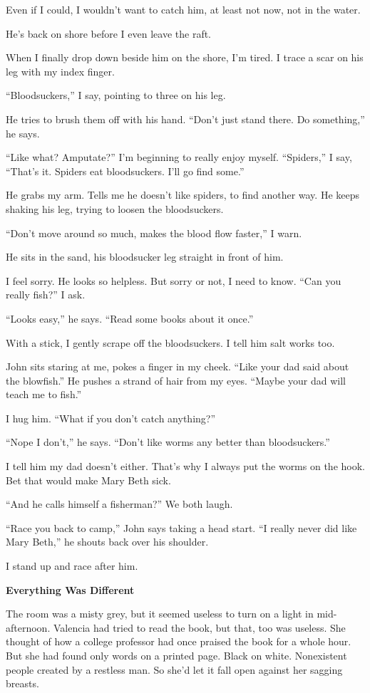 \documentclass[
]{article}
\begin{document}
Even if I could, I wouldn't want to catch him, at least not now, not in
the water.

He's back on shore before I even leave the raft.

When I finally drop down beside him on the shore, I'm tired. I trace a
scar on his leg with my index finger.

``Bloodsuckers,'' I say, pointing to three on his leg.

He tries to brush them off with his hand. ``Don't just stand there. Do
something,'' he says.

``Like what? Amputate?'' I'm beginning to really enjoy myself.
``Spiders,'' I say, ``That's it. Spiders eat bloodsuckers. I'll go find
some.''

He grabs my arm. Tells me he doesn't like spiders, to find another way.
He keeps shaking his leg, trying to loosen the bloodsuckers.

``Don't move around so much, makes the blood flow faster,'' I warn.

He sits in the sand, his bloodsucker leg straight in front of him.

I feel sorry. He looks so helpless. But sorry or not, I need to know.
``Can you really fish?'' I ask.

``Looks easy,'' he says. ``Read some books about it once.''

With a stick, I gently scrape off the bloodsuckers. I tell him salt
works too.

John sits staring at me, pokes a finger in my cheek. ``Like your dad
said about the blowfish.'' He pushes a strand of hair from my eyes.
``Maybe your dad will teach me to fish.''

I hug him. ``What if you don't catch anything?''

``Nope I don't,'' he says. ``Don't like worms any better than
bloodsuckers.''

I tell him my dad doesn't either. That's why I always put the worms on
the hook. Bet that would make Mary Beth sick.

``And he calls himself a fisherman?'' We both laugh.

``Race you back to camp,'' John says taking a head start. ``I really
never did like Mary Beth,'' he shouts back over his shoulder.

I stand up and race after him.

\textbf{\hfill\break
}

\textbf{Everything Was Different}

The room was a misty grey, but it seemed useless to turn on a light in
mid-afternoon. Valencia had tried to read the book, but that, too was
useless. She thought of how a college professor had once praised the
book for a whole hour. But she had found only words on a printed page.
Black on white. Nonexistent people created by a restless man. So she'd
let it fall open against her sagging breasts.
\end{document}
